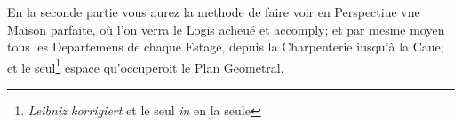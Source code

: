 \pend \pstart [p.~36] En la seconde partie vous aurez la methode de faire voir en Perspectiue\protect{} vne Maison parfaite, o\`{u} l'on verra le Logis acheu\'{e} et accomply; et par mesme moyen tous les Departemens de chaque Estage, depuis la Charpenterie iusqu'\`{a} la Caue; et le seul\footnote{\textit{Leibniz korrigiert} et le seul \textit{in} en la seule} espace qu'occuperoit le Plan Geometral.